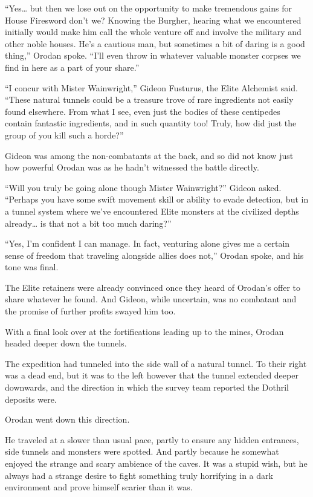 \documentclass[a4paper,10pt]{book}
\begin{document}
“Yes… but then we lose out on the opportunity to make tremendous gains for House Firesword don’t we? Knowing the Burgher, hearing what we encountered initially would make him call the whole venture off and involve the military and other noble houses. He’s a cautious man, but sometimes a bit of daring is a good thing,” Orodan spoke. “I’ll even throw in whatever valuable monster corpses we find in here as a part of your share.”\par
“I concur with Mister Wainwright,” Gideon Fusturus, the Elite Alchemist said. “These natural tunnels could be a treasure trove of rare ingredients not easily found elsewhere. From what I see, even just the bodies of these centipedes contain fantastic ingredients, and in such quantity too! Truly, how did just the group of you kill such a horde?”\par
Gideon was among the non-combatants at the back, and so did not know just how powerful Orodan was as he hadn’t witnessed the battle directly.\par
“Will you truly be going alone though Mister Wainwright?” Gideon asked. “Perhaps you have some swift movement skill or ability to evade detection, but in a tunnel system where we’ve encountered Elite monsters at the civilized depths already… is that not a bit too much daring?”\par
“Yes, I’m confident I can manage. In fact, venturing alone gives me a certain sense of freedom that traveling alongside allies does not,” Orodan spoke, and his tone was final.\par
The Elite retainers were already convinced once they heard of Orodan’s offer to share whatever he found. And Gideon, while uncertain, was no combatant and the promise of further profits swayed him too.\par
With a final look over at the fortifications leading up to the mines, Orodan headed deeper down the tunnels.\par
\par
The expedition had tunneled into the side wall of a natural tunnel. To their right was a dead end, but it was to the left however that the tunnel extended deeper downwards, and the direction in which the survey team reported the Dothril deposits were.\par
Orodan went down this direction.\par
He traveled at a slower than usual pace, partly to ensure any hidden entrances, side tunnels and monsters were spotted. And partly because he somewhat enjoyed the strange and scary ambience of the caves. It was a stupid wish, but he always had a strange desire to fight something truly horrifying in a dark environment and prove himself scarier than it was.\par
\end{document}
